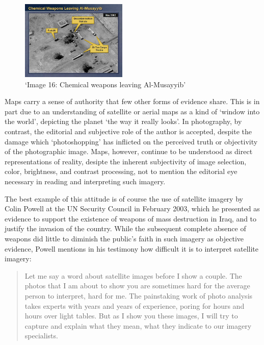 \documentclass[11pt,oneside,notitlepage]{report}
\begin{document}
{{\begin{figure}
	\begin{flushright}
		\includegraphics[width=0.45\textwidth]{images/iraq-image-16.jpg}
		\caption{`Image 16: Chemical weapons leaving Al-Musayyib' \cite{gwu2003eyes}}
	\end{flushright}
\end{figure}

Maps carry a sense of authority that few other forms of evidence share. This is in part due to an understanding of satellite or aerial maps as a kind of `window into the world', depicting the planet `the way it really looks'. In photography, by contrast, the editorial and subjective role of the author is accepted, despite the damage which `photoshopping' has inflicted on the perceived truth or objectivity of the photographic image. Maps, however, continue to be understood as direct representations of reality, desipte the inherent subjectivity of image selection, color, brightness, and contrast processing, not to mention the editorial eye necessary in reading and interpreting such imagery. 

The best example of this attitude is of course the use of satellite imagery by Colin Powell at the UN Security Council in February 2003, which he presented as evidence to support the existence of weapons of mass destruction in Iraq, and to justify the invasion of the country. While the subsequent complete absence of weapons did little to diminish the public's faith in such imagery as objective evidence, Powell mentions in his testimony how difficult it is to interpret satellite imagery:  


\begin{quote}
Let me say a word about satellite images before I show a couple. The photos that I am about to show you are sometimes hard for the average person to interpret, hard for me. The painstaking work of photo analysis takes experts with years and years of experience, poring for hours and hours over light tables. But as I show you these images, I will try to capture and explain what they mean, what they indicate to our imagery specialists.
\cite{guardian2003powell}
\end{quote}

}}
\end{document}
